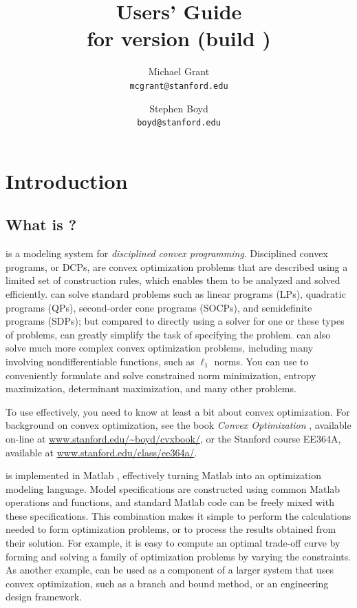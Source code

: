 \documentclass[12pt]{article}
\title{\cvx Users' Guide\\\large for \cvx version \cvxver (build \cvxbuild)}
\author{Michael Grant\\\texttt{mcgrant@stanford.edu} 
\and Stephen Boyd\\\texttt{boyd@stanford.edu}}
\begin{document}
\maketitle
\clearpage
\tableofcontents
\clearpage

\section{Introduction}

\subsection{What is \cvx?}

\cvx is a modeling system for \emph{disciplined convex programming}. 
Disciplined convex programs, or DCPs, are convex optimization problems 
that are described using a limited set of construction rules, which
enables them to be analyzed and solved efficiently.  \cvx can solve 
standard problems such as linear programs (LPs), quadratic programs (QPs),
second-order cone programs (SOCPs), and semidefinite programs (SDPs);
but compared to directly using a solver for one or these types of problems,
\cvx can greatly simplify the task of specifying the problem.
\cvx can also solve much more complex convex optimization problems,
including many involving nondifferentiable functions, such as $\ell_1$
norms.
You can use \cvx to conveniently formulate and solve
constrained norm minimization, entropy maximization,
determinant maximization, and many other problems.

To use \cvx effectively, you need to know at least a bit about 
convex optimization.
For background on convex optimization,
see the book \emph{Convex Optimization} \cite{BV:04}, available on-line
at \url{www.stanford.edu/~boyd/cvxbook/}, or the 
Stanford course EE364A, available at
\url{www.stanford.edu/class/ee364a/}.

\cvx is implemented in Matlab \cite{MATLAB}, effectively
turning Matlab into an optimization modeling language.
Model specifications are constructed using common Matlab
operations and functions, and standard Matlab code can be
freely mixed with these specifications. This combination
makes it simple to perform the calculations
needed to form optimization problems, or to process the
results obtained from their solution. For example, it is easy
to compute an optimal trade-off curve
by forming and solving a family of optimization problems
by varying the constraints. As another example, \cvx can
be used as a component of a larger system that uses convex
optimization, such as a branch and bound method,
or an engineering design framework.
\end{document}
